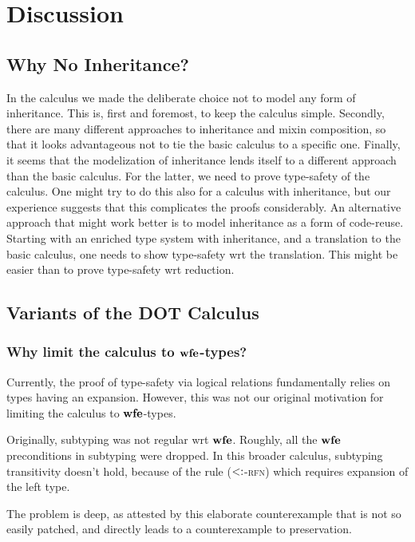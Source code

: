 \documentclass[9pt]{sigplanconf}
\begin{document}
\section{Discussion}\label{discussion}

\subsection{Why No Inheritance?}\label{why-no-inheritance}

In the calculus we made the deliberate choice not to model any form of
inheritance. This is, first and foremost, to keep the calculus simple.
Secondly, there are many different approaches to inheritance and
mixin composition, so that it looks advantageous not to tie the basic
calculus to a specific one. Finally, it seems that the modelization of
inheritance lends itself to a different approach than the basic
calculus. For the latter, we need to prove type-safety of the calculus.
One might try to do this also for a calculus with inheritance, but our
experience suggests that this complicates the proofs considerably.  An
alternative approach that might work better is to model inheritance
as a form of code-reuse. Starting with an enriched type system with
inheritance, and a translation to the basic calculus, one needs to
show type-safety wrt the translation. This might be easier than
to prove type-safety wrt reduction.

\subsection{Variants of the DOT Calculus}\label{dot-variants}

\subsubsection{Why limit the calculus to $\mbox{\textbf{wfe}}$-types?}\label{dot-variants-why-wfe}

Currently, the proof of type-safety via logical relations
fundamentally relies on types having an expansion. However, this was
not our original motivation for limiting the calculus to $\mbox{\textbf{wfe}}$-types.

Originally, subtyping was not regular wrt $\mbox{\textbf{wfe}}$. Roughly,
all the $\mbox{\textbf{wfe}}$ preconditions in subtyping were dropped. In this
broader calculus, subtyping transitivity doesn't hold, because of the
rule (\textsc{$<:$-rfn}) which requires expansion of the left type.

The problem is deep, as attested by this elaborate counterexample
that is not so easily patched, and directly leads to a counterexample
to preservation.
\end{document}
